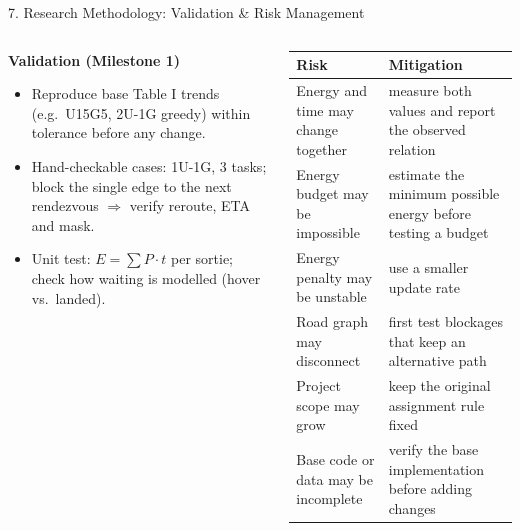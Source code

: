 \documentclass[aspectratio=169,10pt]{beamer}
\begin{document}
\begin{frame}{7. Research Methodology: Validation \& Risk Management}
\small
\begin{columns}[T]
\begin{column}{0.40\textwidth}
\textbf{Validation (Milestone 1)}
\begin{itemize}
  \item Reproduce base Table I trends (e.g.\ U15G5, 2U-1G greedy) within tolerance before any change.
  \item Hand-checkable cases: 1U-1G, 3 tasks; block the single edge to the next rendezvous $\Rightarrow$ verify reroute, ETA and mask.
  \item Unit test: $E=\sum P\cdot t$ per sortie; check how waiting is modelled (hover vs.\ landed).
\end{itemize}
\end{column}
\begin{column}{0.57\textwidth}
\scriptsize
\renewcommand{\arraystretch}{1.25}
\begin{tabular}{P{3.2cm}P{4.3cm}}
\toprule
\textbf{Risk} & \textbf{Mitigation}\\
\midrule
Energy and time may change together & measure both values and report the observed relation\\
Energy budget may be impossible & estimate the minimum possible energy before testing a budget\\
Energy penalty may be unstable & use a smaller update rate\\
Road graph may disconnect & first test blockages that keep an alternative path\\
Project scope may grow & keep the original assignment rule fixed\\
Base code or data may be incomplete & verify the base implementation before adding changes\\
\bottomrule
\end{tabular}
\end{column}
\end{columns}
\end{frame}
\end{document}
